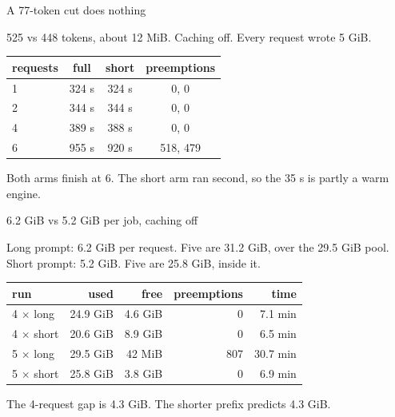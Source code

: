 \documentclass[aspectratio=169]{beamer}
\begin{document}
\begin{frame}{A 77-token cut does nothing}

525 vs 448 tokens, about 12 MiB. Caching off. Every request wrote 5 GiB.

\begin{center}
\begin{tabular}{lccc}
\toprule
requests & full & short & preemptions \\
\midrule
1 & 324 s & 324 s & 0, 0 \\
2 & 344 s & 344 s & 0, 0 \\
4 & 389 s & 388 s & 0, 0 \\
6 & 955 s & 920 s & 518, 479 \\
\bottomrule
\end{tabular}
\end{center}

Both arms finish at 6. The short arm ran second, so the 35 s is partly a warm engine.

\end{frame}

\begin{frame}{6.2 GiB vs 5.2 GiB per job, caching off}

Long prompt: 6.2 GiB per request. Five are 31.2 GiB, over the 29.5 GiB pool.
Short prompt: 5.2 GiB. Five are 25.8 GiB, inside it.

\begin{center}
\begin{tabular}{lrrrr}
\toprule
run & used & free & preemptions & time \\
\midrule
4 $\times$ long & 24.9 GiB & 4.6 GiB & 0 & 7.1 min \\
4 $\times$ short & 20.6 GiB & 8.9 GiB & 0 & 6.5 min \\
5 $\times$ long & 29.5 GiB & 42 MiB & 807 & 30.7 min \\
5 $\times$ short & 25.8 GiB & 3.8 GiB & 0 & 6.9 min \\
\bottomrule
\end{tabular}
\end{center}

The 4-request gap is 4.3 GiB. The shorter prefix predicts 4.3 GiB.

\end{frame}
\end{document}
